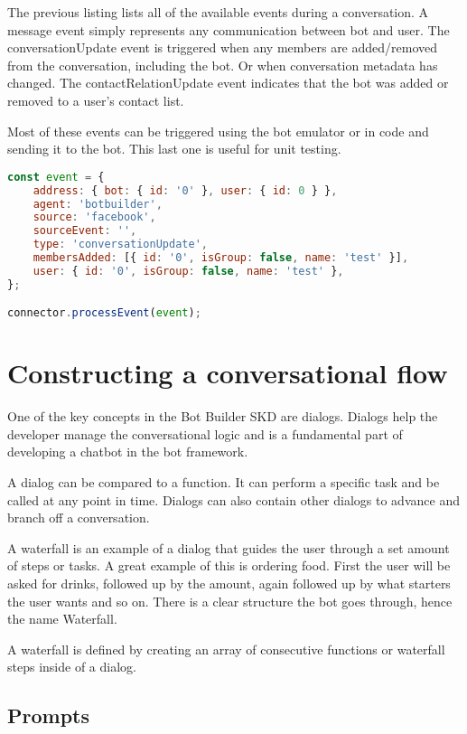The previous listing lists all of the available events during a conversation. A message event simply represents any communication between bot and user. The conversationUpdate event is triggered when any members are added/removed from the conversation, including the bot. Or when conversation metadata has changed. The contactRelationUpdate event indicates that the bot was added or removed to a user's contact list.

Most of these events can be triggered using the bot emulator or in code and sending it to the bot. This last one is useful for unit testing.

\begin{lstlisting}[language=JavaScript,caption=Sending a mock event to the bot,label=listing:botframework-mock-event]
const event = {
	address: { bot: { id: '0' }, user: { id: 0 } },
	agent: 'botbuilder',
	source: 'facebook',
	sourceEvent: '',
	type: 'conversationUpdate',
	membersAdded: [{ id: '0', isGroup: false, name: 'test' }],
	user: { id: '0', isGroup: false, name: 'test' },
};

connector.processEvent(event);
\end{lstlisting}

\section{Constructing a conversational flow}

One of the key concepts in the Bot Builder SKD are dialogs. Dialogs help the developer manage the conversational logic and is a fundamental part of developing a chatbot in the bot framework.

A dialog can be compared to a function. It can perform a specific task and be called at any point in time. Dialogs can also contain other dialogs to advance and branch off a conversation.

A waterfall is an example of a dialog that guides the user through a set amount of steps or tasks. A great example of this is ordering food. First the user will be asked for drinks, followed up by the amount, again followed up by what starters the user wants and so on. There is a clear structure the bot goes through, hence the name Waterfall.

A waterfall is defined by creating an array of consecutive functions or waterfall steps inside of a dialog.

\subsection{Prompts}

